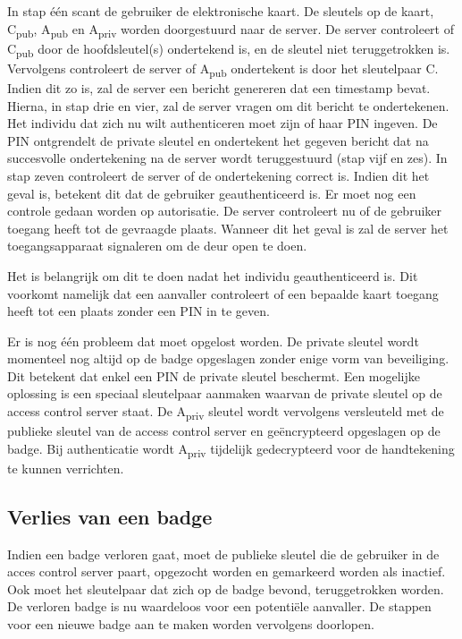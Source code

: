 In stap één scant de gebruiker de elektronische kaart. De sleutels op de kaart,
C\textsubscript{pub}, A\textsubscript{pub} en A\textsubscript{priv} worden
doorgestuurd naar de server. De server controleert of C\textsubscript{pub} door
de hoofdsleutel(s) ondertekend is, en de sleutel niet teruggetrokken is.
Vervolgens controleert de server of A\textsubscript{pub} ondertekent is door het
sleutelpaar C.
Indien dit zo is, zal de server een bericht genereren dat een timestamp bevat.
Hierna, in stap drie en vier, zal de server vragen om dit bericht te
ondertekenen. Het individu dat zich nu wilt authenticeren moet zijn of haar PIN
ingeven. De PIN ontgrendelt de private sleutel en ondertekent het gegeven
bericht dat na succesvolle ondertekening na de server wordt teruggestuurd (stap
vijf en zes). In stap zeven controleert de server of de ondertekening correct
is. Indien dit het geval is, betekent dit dat de gebruiker geauthenticeerd is.
Er moet nog een controle gedaan worden op autorisatie. De server controleert nu
of de gebruiker toegang heeft tot de gevraagde plaats. Wanneer dit het geval is
zal de server het toegangsapparaat signaleren om de deur open te doen.

Het is belangrijk om dit te doen nadat het individu geauthenticeerd is. Dit
voorkomt namelijk dat een aanvaller controleert of een bepaalde kaart toegang
heeft tot een plaats zonder een PIN in te geven.

Er is nog één probleem dat moet opgelost worden. De private sleutel wordt
momenteel nog altijd op de badge opgeslagen zonder enige vorm van beveiliging.
Dit betekent dat enkel een PIN de private sleutel beschermt. Een mogelijke
oplossing is een speciaal sleutelpaar aanmaken waarvan de private sleutel op de
access control server staat. De A\textsubscript{priv} sleutel wordt vervolgens
versleuteld met de publieke sleutel van de access control server en
geëncrypteerd opgeslagen op de badge. Bij authenticatie wordt
A\textsubscript{priv} tijdelijk gedecrypteerd voor de handtekening te kunnen
verrichten.

\subsection{Verlies van een badge}

Indien een badge verloren gaat, moet de publieke sleutel die de gebruiker in de
acces control server paart, opgezocht worden en gemarkeerd worden als inactief.
Ook moet het sleutelpaar dat zich op de badge bevond, teruggetrokken worden. De
verloren badge is nu waardeloos voor een potentiële aanvaller. De stappen voor
een nieuwe badge aan te maken worden vervolgens doorlopen.

